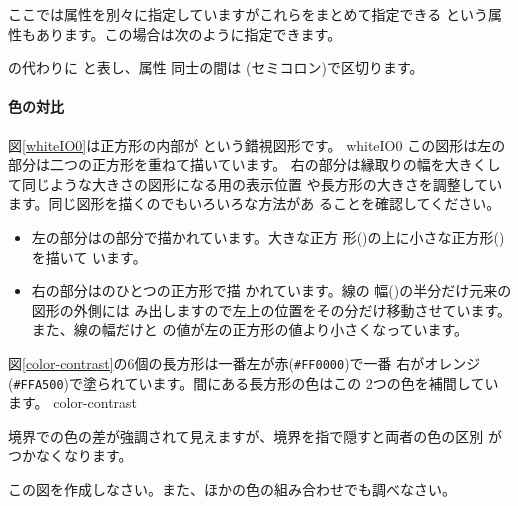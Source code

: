 ここでは属性を別々に指定していますがこれらをまとめて指定できる
 という属性もあります。この場合は次のように指定できます。
\begin{center}
\end{center}
の代わりに  と表し、属性
同士の間は \Showattrib{;}(セミコロン)で区切ります。

\paragraph{色の対比}
図\ref{whiteIO0}は正方形の内部が
という錯視図形です。
{whiteIO0}
この図形は左の部分は二つの正方形を重ねて描いています。
右の部分は縁取りの幅を大きくして同じような大きさの図形になる用の表示位置
や長方形の大きさを調整しています。同じ図形を描くのでもいろいろな方法があ
ることを確認してください。
\begin{itemize}
 \item 左の部分はの部分で描かれています。大きな正方
       形()の上に小さな正方形()を描いて
       います。
 \item 右の部分はのひとつの正方形で描
       かれています。線の
       幅()の半分だけ元来の図形の外側には
       み出しますので左上の位置をその分だけ移動させています。
       また、線の幅だけと
       の値が左の正方形の値より小さくなっています。
\end{itemize}
\begin{Problem}\upshape\label{prob-contrast}
図\ref{color-contrast}の6個の長方形は一番左が赤(\texttt{\#FF0000})で一番
 右がオレンジ(\texttt{\#FFA500})で塗られています。間にある長方形の色はこの
 2つの色を補間しています\cite[カラー図版3]{Ninio}。
{\protect{}}{color-contrast}

境界での色の差が強調されて見えますが、境界を指で隠すと両者の色の区別
 がつかなくなります。

この図を作成しなさい。また、ほかの色の組み合わせでも調べなさい。
\end{Problem}

